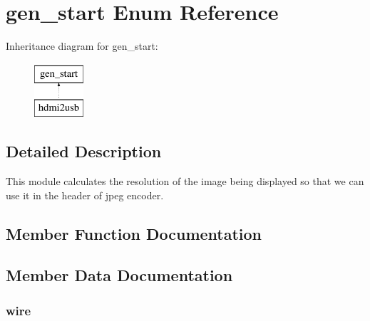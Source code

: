 \section{gen\-\_\-start Enum Reference}
\label{enum1gen__start}
Inheritance diagram for gen\-\_\-start\-:\begin{figure}[H]
\begin{center}
\leavevmode
\includegraphics[height=2.000000cm]{enum1gen__start}
\end{center}
\end{figure}


\subsection{Detailed Description}
This module calculates the resolution of the image being displayed so that we can use it in the header of jpeg encoder. 

\subsection{Member Function Documentation}
\subsubsection[{P\-R\-O\-C\-E\-S\-S\-\_\-18}]{\setlength{\rightskip}{0pt plus 5cm}\hspace{0.3cm}}\label{enum1gen__start_a026925c8dec836bfa0e4c7a07afbdee9}


\subsection{Member Data Documentation}
\subsubsection[{rst\-\_\-n}]{ {\bfseries \textcolor{vhdlchar}{wire}\textcolor{vhdlchar}{ }} \hspace{0.3cm}}\label{enum1gen__start_a756d41eb7aa9ca8787d59c051c3c7ad2}
